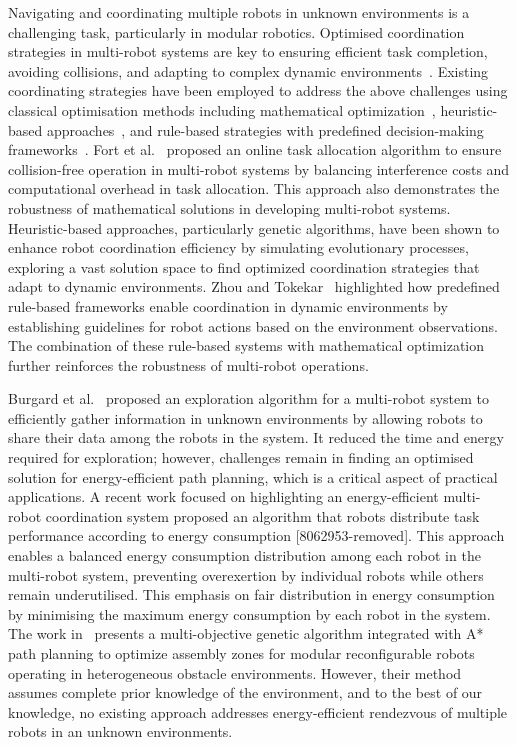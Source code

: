 \documentclass[journal]{IEEEtran}
\begin{document}
Navigating and coordinating multiple robots in unknown environments is a challenging task, particularly in modular robotics.
Optimised coordination strategies in multi-robot systems are key to ensuring efficient task completion, avoiding collisions, and adapting to complex dynamic environments~\cite{liu2020prediction,Zhou2021-mx}. Existing coordinating strategies have been employed to address the above challenges using classical optimisation methods including mathematical optimization~\cite{Liu2016-bm,9387084}, heuristic-based approaches~\cite{Yao_Ye_Dai_2018}, and rule-based strategies with predefined decision-making frameworks~\cite{Boldrer2023-jy}.
Fort et al.~\cite{9387084} proposed an online task allocation algorithm to ensure collision-free operation in multi-robot systems by balancing interference costs and computational overhead in task allocation. This approach also demonstrates the robustness of mathematical solutions in developing multi-robot systems. Heuristic-based approaches, particularly genetic algorithms, have been shown to enhance robot coordination efficiency by simulating evolutionary processes, exploring a vast solution space to find optimized coordination strategies that adapt to dynamic environments.
Zhou and Tokekar~\cite{Zhou2021-mx} highlighted how predefined rule-based frameworks enable coordination in dynamic environments by establishing guidelines for robot actions based on the environment observations. The combination of these rule-based systems with mathematical optimization further reinforces the robustness of multi-robot operations.

Burgard et al.~\cite{1435481} proposed an exploration algorithm for a multi-robot system to efficiently gather information in unknown environments by allowing robots to share their data among the robots in the system. It reduced the time and energy required for exploration; however, challenges remain in finding an optimised solution for energy-efficient path planning, which is a critical aspect of practical applications.
\textcolor{green!60!black}{A recent work focused on highlighting an energy-efficient multi-robot coordination system proposed an algorithm that robots distribute task performance according to energy consumption [8062953-removed]. This approach enables a balanced energy consumption distribution among each robot in the multi-robot system, preventing overexertion by individual robots while others remain underutilised. This emphasis on fair distribution in energy consumption by minimising the maximum energy consumption by each robot in the system.}
The work in~\cite{pasumarthi2025determining} presents a multi-objective genetic algorithm integrated with A* path planning to optimize assembly zones for modular reconfigurable robots operating in heterogeneous obstacle environments. However, their method assumes complete prior knowledge of the environment, and to the best of our knowledge, no existing approach addresses energy-efficient rendezvous of multiple robots in an unknown environments.
\end{document}
